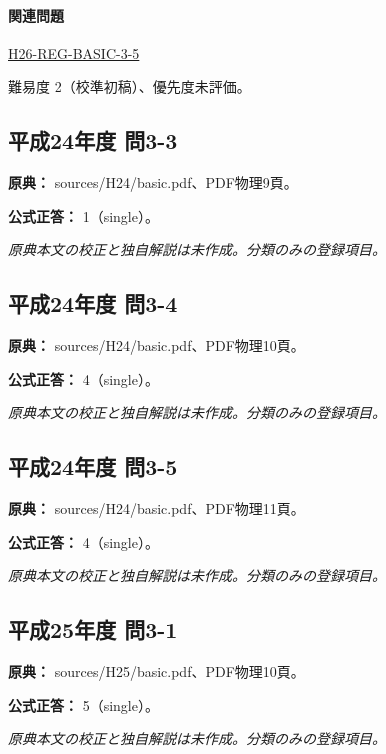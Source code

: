 \paragraph{関連問題} \hyperref[q:h26-reg-basic-3-5]{H26-REG-BASIC-3-5}

\par 難易度 2（校準初稿）、優先度未評価。

\subsection{平成24年度 問3-3}
\label{q:h24-reg-basic-3-3}

\noindent\textbf{原典：} sources/H24/basic.pdf、PDF物理9頁。

\textbf{公式正答：} 1（single）。

\par\textit{原典本文の校正と独自解説は未作成。分類のみの登録項目。}

\subsection{平成24年度 問3-4}
\label{q:h24-reg-basic-3-4}

\noindent\textbf{原典：} sources/H24/basic.pdf、PDF物理10頁。

\textbf{公式正答：} 4（single）。

\par\textit{原典本文の校正と独自解説は未作成。分類のみの登録項目。}

\subsection{平成24年度 問3-5}
\label{q:h24-reg-basic-3-5}

\noindent\textbf{原典：} sources/H24/basic.pdf、PDF物理11頁。

\textbf{公式正答：} 4（single）。

\par\textit{原典本文の校正と独自解説は未作成。分類のみの登録項目。}

\subsection{平成25年度 問3-1}
\label{q:h25-reg-basic-3-1}

\noindent\textbf{原典：} sources/H25/basic.pdf、PDF物理10頁。

\textbf{公式正答：} 5（single）。

\par\textit{原典本文の校正と独自解説は未作成。分類のみの登録項目。}


